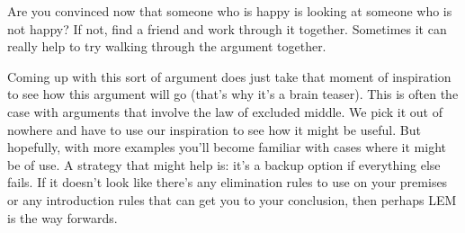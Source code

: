 \begin{fitchproof}
	\open
	\close
	\open
	\close
\end{fitchproof}

Are you convinced now that someone who is happy is looking at someone who is not happy? If not, find a friend and work through it together. Sometimes it can really help to try walking through the argument together.

Coming up with this sort of argument does just take that moment of inspiration to see how this argument will go (that's why it's a brain teaser). This is often the case with arguments that involve the law of excluded middle. We pick it out of nowhere and have to use our inspiration to see how it might be useful. But hopefully, with more examples you'll become familiar with cases where it might be of use. A strategy that might help is: it's a backup option if everything else fails. If it doesn't look like there's any elimination rules to use on your premises or any introduction rules that can get you to your conclusion, then perhaps LEM is the way forwards.


